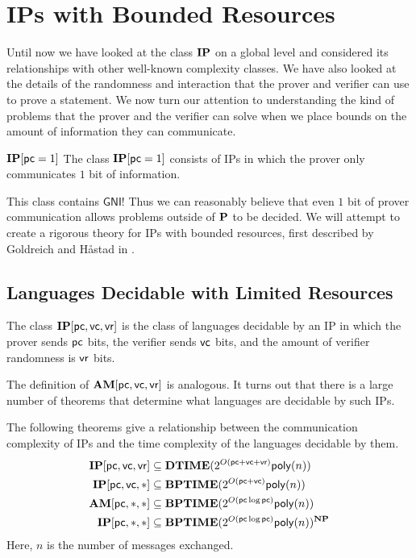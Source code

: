 \section{IPs with Bounded Resources}

Until now we have looked at the class $\mathbf{IP}$ on a global level and considered its relationships with other well-known complexity classes. We have also looked at the details of the randomness and interaction that the prover and verifier can use to prove a statement. We now turn our attention to understanding the kind of problems that the prover and the verifier can solve when we place bounds on the amount of information they can communicate.

\begin{definition}{$\mathbf{IP}[\mathsf{pc}=1]$}
	The class $\mathbf{IP}[\mathsf{pc}=1]$ consists of IPs in which the prover only communicates $1$ bit of information.
\end{definition}

This class contains $\mathsf{GNI}$! Thus we can reasonably believe that even $1$ bit of prover communication allows problems outside of $\mathbf{P}$ to be decided. We will attempt to create a rigorous theory for IPs with bounded resources, first described by Goldreich and H\aa stad in \cite{10.1016/S0020-0190(98)00116-1}.

\subsection{Languages Decidable with Limited Resources}

\begin{definition}
	The class $\mathbf{IP}[\mathsf{pc},\mathsf{vc},\mathsf{vr}]$ is the class of languages decidable by an IP in which the prover sends $\mathsf{pc}$ bits, the verifier sends $\mathsf{vc}$ bits, and the amount of verifier randomness is $\mathsf{vr}$ bits.
\end{definition}

The definition of $\mathbf{AM}[\mathsf{pc},\mathsf{vc},\mathsf{vr}]$ is analogous. It turns out that there is a large number of theorems that determine what languages are decidable by such IPs.

\begin{theorem}
	The following theorems give a relationship between the communication complexity of IPs and the time complexity of the languages decidable by them.
	\begin{align*}
		\mathbf{IP}[\mathsf{pc},\mathsf{vc},\mathsf{vr}]&\subseteq\mathbf{DTIME}(2^{O(\mathsf{pc}+\mathsf{vc}+\mathsf{vr})}\mathsf{poly}(n))\\
		\mathbf{IP}[\mathsf{pc},\mathsf{vc},*]&\subseteq\mathbf{BPTIME}(2^{O(\mathsf{pc}+\mathsf{vc})}\mathsf{poly}(n))\\
		\mathbf{AM}[\mathsf{pc},*,*]&\subseteq\mathbf{BPTIME}(2^{O(\mathsf{pc}\log\mathsf{pc})}\mathsf{poly}(n))\\
		\mathbf{IP}[\mathsf{pc},*,*]&\subseteq\mathbf{BPTIME}(2^{O(\mathsf{pc}\log\mathsf{pc})}\mathsf{poly}(n))^{\mathbf{NP}}
	\end{align*}
	Here, $n$ is the number of messages exchanged.
	\label{thm:boundedip}
\end{theorem}

